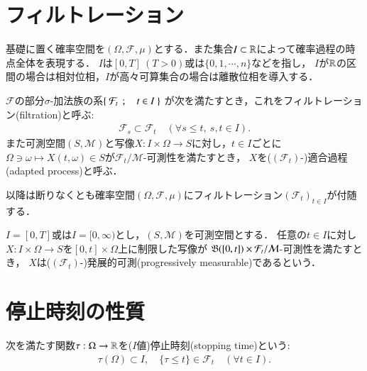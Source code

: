 \section{フィルトレーション}
	基礎に置く確率空間を$(\Omega,\mathcal{F},\mu)$とする．また集合$I \subset \mathbb{R}$によって確率過程の時点全体を表現する．
	$I$は$[0,T]\ (T > 0)$或は$\{0,1,\cdots,n\}$などを指し，
	$I$が$\mathbb{R}$の区間の場合は相対位相，$I$が高々可算集合の場合は離散位相を導入する．
	\begin{screen}
		\begin{dfn}
			$\mathcal{F}$の部分$\sigma$-加法族の系$\left\{\ \mathcal{F}_t\ \, ; \quad t \in I\ \right\}$
			が次を満たすとき，これをフィルトレーション(filtration)と呼ぶ:
			\begin{align}
				\mathcal{F}_s \subset \mathcal{F}_t
				\quad (\forall s \leq t,\ s,t \in I).
			\end{align}
			また可測空間$(S,\mathcal{M})$と写像$X:I \times \Omega \rightarrow S$に対し，$t \in I$ごとに
			$\Omega \ni \omega \longmapsto X(t,\omega) \in S$が$\mathcal{F}_t/\mathcal{M}$-可測性を満たすとき，
			$X$を($(\mathcal{F}_t)$-)適合過程(adapted process)と呼ぶ．
		\end{dfn}
	\end{screen}
	
	以降は断りなくとも確率空間$(\Omega,\mathcal{F},\mu)$にフィルトレーション$(\mathcal{F}_t)_{t \in I}$が付随する．
	
	\begin{screen}
		\begin{dfn}[発展的可測性]
			$I = [0,T]$或は$I = [0,\infty)$とし，$(S,\mathcal{M})$を可測空間とする．
			任意の$t \in I$に対し$X:I \times \Omega \rightarrow S$を$[0,t] \times \Omega$上に制限した写像が
			$\mathfrak{B}([0,t]) \times \mathcal{F}_t/\mathcal{M}$-可測性を満たすとき，
			$X$は($(\mathcal{F}_t)$-)発展的可測(progressively measurable)であるという．
		\end{dfn}
	\end{screen}
	
	\begin{screen}
		\begin{thm}[右連続適合過程は発展的可測]
			
		\end{thm}
	\end{screen}
	
\section{停止時刻の性質}
	\begin{screen}
		\begin{dfn}[停止時刻]
			次を満たす関数$\tau:\Omega \rightarrow \mathbb{R}$を($I$値)停止時刻(stopping time)という:
			\begin{align}
				\tau(\Omega) \subset I,
				\quad \{ \tau \leq t \} \in \mathcal{F}_t \quad (\forall t \in I).
			\end{align}
		\end{dfn}
	\end{screen}
	
